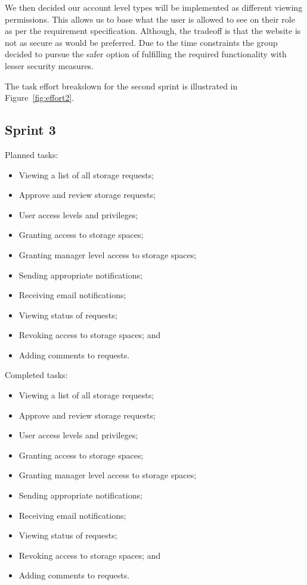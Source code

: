 \documentclass[a4paper,titlepage,12pt]{article}
\begin{document}
We then decided our account level types will be implemented as different
viewing permissions. This allows us to base what the user is allowed to see on
their role as per the requirement specification. Although, the tradeoff is that
the website is not as secure as would be preferred. Due to the time constraints
the group decided to pursue the safer option of fulfilling the required
functionality with lesser security measures.

The task effort breakdown for the second sprint is illustrated in
Figure~\ref{fig:effort2}.

\newpage

\subsection{Sprint 3}

Planned tasks:

\begin{itemize}
	\item Viewing a list of all storage requests;
	\item Approve and review storage requests;
	\item User access levels and privileges;
	\item Granting access to storage spaces;
	\item Granting manager level access to storage spaces;
	\item Sending appropriate notifications;
	\item Receiving email notifications;
	\item Viewing status of requests;
	\item Revoking access to storage spaces; and
	\item Adding comments to requests.
\end{itemize}

Completed tasks:

\begin{itemize}
	\item Viewing a list of all storage requests;
	\item Approve and review storage requests;
	\item User access levels and privileges;
	\item Granting access to storage spaces;
	\item Granting manager level access to storage spaces;
	\item Sending appropriate notifications;
	\item Receiving email notifications;
	\item Viewing status of requests;
	\item Revoking access to storage spaces; and
	\item Adding comments to requests.
\end{itemize}
\end{document}
